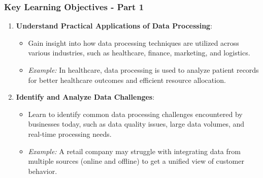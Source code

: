 \documentclass{beamer}
\begin{document}
\begin{frame}
    \frametitle{Key Learning Objectives - Part 1}
    \begin{enumerate}
        \item \textbf{Understand Practical Applications of Data Processing}:
            \begin{itemize}
                \item Gain insight into how data processing techniques are utilized across various industries, such as healthcare, finance, marketing, and logistics.
                \item \textit{Example:} In healthcare, data processing is used to analyze patient records for better healthcare outcomes and efficient resource allocation.
            \end{itemize}
            
        \item \textbf{Identify and Analyze Data Challenges}:
            \begin{itemize}
                \item Learn to identify common data processing challenges encountered by businesses today, such as data quality issues, large data volumes, and real-time processing needs.
                \item \textit{Example:} A retail company may struggle with integrating data from multiple sources (online and offline) to get a unified view of customer behavior.
            \end{itemize}
    \end{enumerate}
\end{frame}
\end{document}
